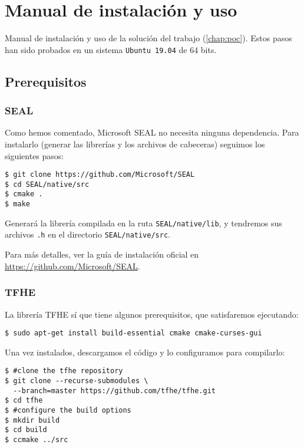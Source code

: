 \chapter{Manual de instalación y uso}
\label{appendix:manual}

Manual de instalación y uso de la solución del trabajo (\ref{chap:poc}). Estos pasos han sido probados en un sistema \verb|Ubuntu 19.04| de 64 bits.

\section{Prerequisitos}

\subsection{SEAL}

Como hemos comentado, Microsoft SEAL no necesita ninguna dependencia. Para instalarlo (generar las librerías y los archivos de cabeceras) seguimos los siguientes pasos:

\begin{verbatim}
$ git clone https://github.com/Microsoft/SEAL
$ cd SEAL/native/src
$ cmake .
$ make
\end{verbatim}

Generará la librería compilada en la ruta \verb|SEAL/native/lib|, y tendremos sus archivos \verb|.h| en el directorio \verb|SEAL/native/src|.

Para más detalles, ver la guía de instalación oficial en \url{https://github.com/Microsoft/SEAL}.

\subsection{TFHE}

La librería TFHE sí que tiene algunos prerequisitos, que satisfaremos ejecutando:

\begin{verbatim}
$ sudo apt-get install build-essential cmake cmake-curses-gui
\end{verbatim}

Una vez instalados, descargamos el código y lo configuramos para compilarlo:

\begin{verbatim}
$ #clone the tfhe repository
$ git clone --recurse-submodules \
  --branch=master https://github.com/tfhe/tfhe.git
$ cd tfhe
$ #configure the build options
$ mkdir build
$ cd build
$ ccmake ../src
\end{verbatim}

